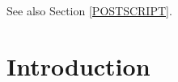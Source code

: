 \documentclass[11pt]{article}
\begin{document}




See also Section \ref{POSTSCRIPT}.

\section{Introduction}
\end{document}
